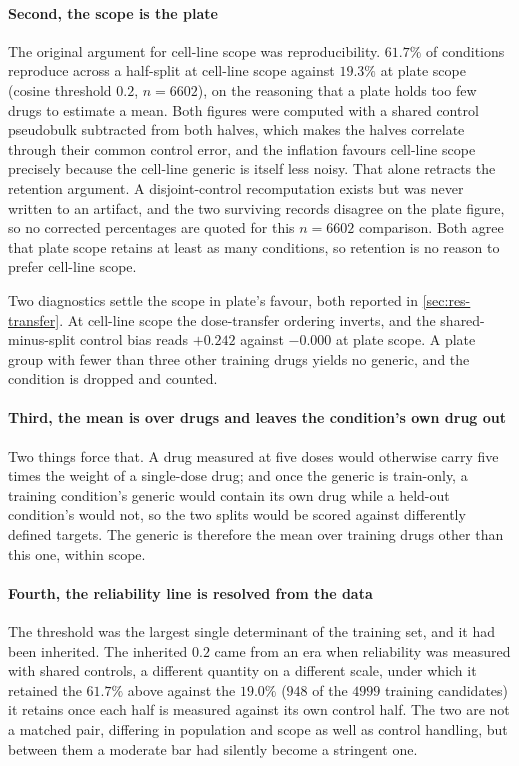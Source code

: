 \paragraph{Second, the scope is the plate} The original argument for cell-line
scope was reproducibility. $61.7\%$ of conditions reproduce across a half-split
at cell-line scope against $19.3\%$ at plate scope (cosine threshold $0.2$,
$n = 6602$), on the reasoning that a plate holds too few drugs to estimate a
mean. Both
figures were computed with a shared control pseudobulk subtracted from both
halves, which makes the halves correlate through their common control error, and
the inflation favours cell-line scope precisely because the cell-line generic is
itself less noisy. That alone retracts the retention argument. A disjoint-control
recomputation exists but was never written to an artifact, and the two surviving
records disagree on the plate figure, so no corrected percentages are quoted for
this $n = 6602$ comparison. Both agree that plate scope retains at least as many
conditions, so retention is no reason to prefer cell-line scope.

Two diagnostics settle the scope in plate's favour, both reported in
\cref{sec:res-transfer}. At cell-line scope the dose-transfer ordering inverts,
and the shared-minus-split control bias reads $+0.242$ against $-0.000$ at plate
scope. A plate group with fewer than three other training drugs yields no
generic, and the condition is dropped and counted.

\paragraph{Third, the mean is over drugs and leaves the condition's own drug out}
Two things force that. A drug measured at five doses would otherwise carry five
times the weight of a single-dose drug; and once the generic is train-only, a
training condition's generic would contain its own drug while a held-out
condition's would not, so the two splits would be scored against differently
defined targets. The generic is therefore the mean over training drugs other
than this one, within scope.

\paragraph{Fourth, the reliability line is resolved from the data} The threshold
was the largest single determinant of the training set, and it had been
inherited. The inherited $0.2$ came from an era when reliability was measured
with shared controls, a different quantity on a different scale, under which it
retained the $61.7\%$ above against the $19.0\%$ ($\num{948}$ of the $\num{4999}$
training candidates) it retains once each half is measured against its own
control half. The two are not a matched pair, differing in population and scope
as well as control handling, but between them a moderate bar had silently become
a stringent one.

